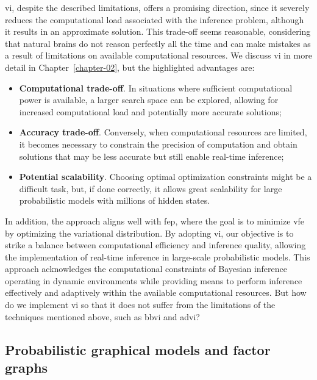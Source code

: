 \Ac{vi}, despite the described limitations, offers a promising direction, since it severely reduces the computational load associated with the inference problem, although it results in an approximate solution. This trade-off seems reasonable, considering that natural brains do not reason perfectly all the time and can make mistakes as a result of limitations on available computational resources. We discuss \ac{vi} in more detail in Chapter~\ref{chapter-02}, but the highlighted advantages are:
\begin{itemize}
    \item \textbf{Computational trade-off}. In situations where sufficient computational power is available, a larger search space can be
explored, allowing for increased computational load and potentially more accurate solutions;
    \item \textbf{Accuracy trade-off}. Conversely, when computational resources are limited, it becomes necessary to constrain the precision of computation and obtain solutions that may be less accurate but still enable real-time inference;
    \item \textbf{Potential scalability}. Choosing optimal optimization constraints might be a difficult task, but, if done correctly, it allows great scalability for large probabilistic models with millions of hidden states.
\end{itemize}

In addition, the approach aligns well with \ac{fep}, where the goal is to minimize \ac{vfe} by optimizing the variational distribution.
By adopting \ac{vi}, our objective is to strike a balance between computational
efficiency and inference quality, allowing the implementation of real-time inference in
large-scale probabilistic models.
This approach acknowledges the computational constraints of Bayesian inference operating in
dynamic environments while providing means to perform inference effectively and adaptively
within the available computational resources.
But how do we implement \ac{vi} so that it does not suffer from the limitations of the techniques mentioned above, such as \ac{bbvi} and \ac{advi}? 


\subsection{Probabilistic graphical models and factor graphs}

